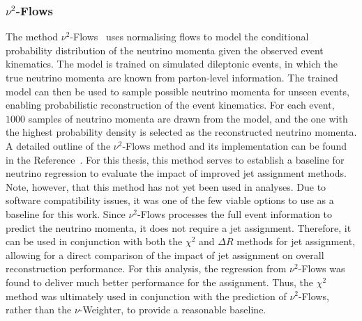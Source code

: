 \subsubsection{$\nu^2$-Flows}
\label{sec:nu_flows}
The method $\nu^2$-Flows~\cite{nu_square_flows} uses normalising flows to model the conditional probability distribution of the neutrino momenta given the observed event kinematics. The model is trained on simulated dileptonic \ttbar events, in which the true neutrino momenta are known from parton-level information. The trained model can then be used to sample possible neutrino momenta for unseen events, enabling probabilistic reconstruction of the event kinematics. For each event, $1000$ samples of neutrino momenta are drawn from the model, and the one with the highest probability density is selected as the reconstructed neutrino momenta. A detailed outline of the $\nu^2$-Flows method and its implementation can be found in the Reference~\cite{nu_square_flows}. For this thesis, this method serves to establish a baseline for neutrino regression to evaluate the impact of improved jet assignment methods. Note, however, that this method has not yet been used in \atlas analyses. Due to software compatibility issues, it was one of the few viable options to use as a baseline for this work. Since $\nu^2$-Flows processes the full event information to predict the neutrino momenta, it does not require a jet assignment. Therefore, it can be used in conjunction with both the $\chi^2$ and $\Delta R$ methods for jet assignment, allowing for a direct comparison of the impact of jet assignment on overall reconstruction performance.
For this analysis, the regression from $\nu^2$-Flows was found to deliver much better performance for the assignment. Thus, the $\chi^2$ method was ultimately used in conjunction with the prediction of $\nu^2$-Flows, rather than the $\nu$-Weighter, to provide a reasonable baseline.
